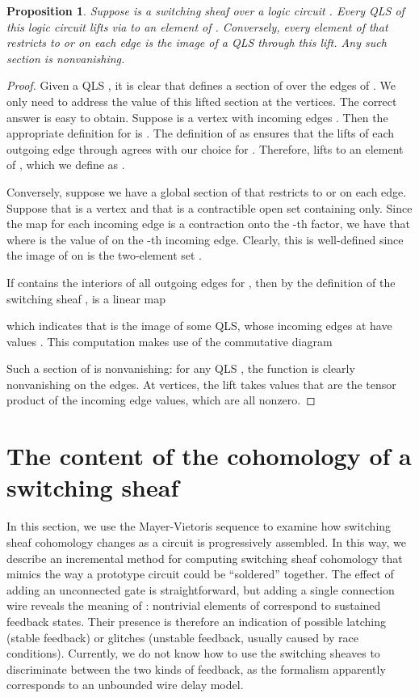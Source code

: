 \documentclass{amsart}
\theoremstyle{plain}
\newtheorem{prop}[thm]{Proposition}
\theoremstyle{definition}
\begin{document}
\begin{prop}
\label{qls_subset_h0_prop}
Suppose  is a switching sheaf over a logic circuit .
Every QLS of this logic circuit lifts via  to an element of
.  Conversely, every element of
 that restricts to
 or
   on each edge is the image of a
    QLS through this lift.  Any such section is nonvanishing.
\end{prop}
\begin{proof}
Given a QLS , it is clear that  defines a section of
 over the edges of .  We only need to address the
value of this lifted section at the vertices.  The correct answer is
easy to obtain.  Suppose  is a vertex with incoming edges
.  Then the appropriate definition for 
is .  The definition of  as  ensures that
the lifts of each outgoing edge through  agrees with our choice for
.  Therefore,  lifts to an element of
, which we define as .

Conversely, suppose we have a global section  of 
that restricts to  or
   on each edge.  Suppose that 
    is a vertex and that  is a contractible open set containing 
    only.  Since the map  for
    each incoming edge  is a contraction onto the -th factor,
    we have that  where  is the value of  on the -th
    incoming edge.  Clearly, this is well-defined since the image of
     on  is the two-element set
    . 

If  contains the interiors of all outgoing edges for , then by
the definition of the switching sheaf ,  is a linear map

which indicates that  is the image of some QLS, whose incoming
edges at  have values .  This computation makes use
of the commutative diagram


Such a section of  is nonvanishing: for any QLS , the
function  is clearly nonvanishing on the edges.  At
vertices, the lift takes values that are the tensor product of the
incoming edge values, which are all nonzero.
\end{proof}

\section{The content of the cohomology of a switching sheaf}
\label{h1_sec}

In this section, we use the Mayer-Vietoris sequence to examine how
switching sheaf cohomology changes as a circuit is progressively
assembled.  In this way, we describe an incremental method for
computing switching sheaf cohomology that mimics the way a prototype
circuit could be ``soldered'' together.  The effect of adding an
unconnected gate is straightforward, but adding a single connection
wire reveals the meaning of : nontrivial elements of 
correspond to sustained feedback states. Their presence is therefore
an indication of possible latching (stable feedback) or glitches
(unstable feedback, usually caused by race conditions).  Currently, we
do not know how to use the switching sheaves to discriminate
between the two kinds of feedback, as the formalism apparently corresponds to an
unbounded wire delay model.
\end{document}
